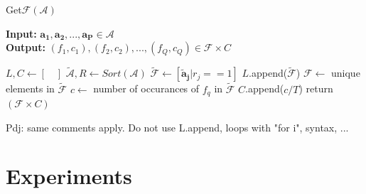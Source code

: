 \documentclass[conference]{IEEEtran}
\newcommand{\p}[1]{{\color{blue} Pdj: #1}}
\begin{document}
\begin{algorithm}
	\caption{ Get$\mathcal{F}$$(\mathcal{A})$ }
	\label{alg:f}
	\hspace*{\algorithmicindent} \textbf{Input: } $ \mathbf{a_1},\mathbf{a_2} ,..., \mathbf{a_P}\in \mathcal{A}$ \\
	\hspace*{\algorithmicindent} \textbf{Output: } $ (f_1,c_1), (f_2, c_2), ..., (f_Q,c_Q) \in \mathcal{F} \times C  $
	\begin{algorithmic}[1] 
		\State $L, C \leftarrow [ \quad ]$ 
		\State $\tilde{\mathcal{A}}, R \leftarrow Sort(\mathcal{A})$
		\State $\tilde{\mathcal{F}} \leftarrow [\mathbf{\tilde{a}_j} | r_j == 1 ]$ 
		\State $L$.append($\tilde{\mathcal{F}}$)
		\EndFor
		\State $\mathcal{F} \leftarrow $ unique elements in $\tilde{\mathcal{F}}$ 
		\State $c \leftarrow$ number of occurances of $f_q$ in $\tilde{\mathcal{F}}$ 
		\State $C$.append($c/T$)
		\EndFor
		\State return $(\mathcal{F} \times C)$
              \end{algorithmic}
              \p{same comments apply. Do not use L.append, loops with "for i", syntax, ...}
\end{algorithm}

\section{Experiments}
\label{sec:exp}
\end{document}
